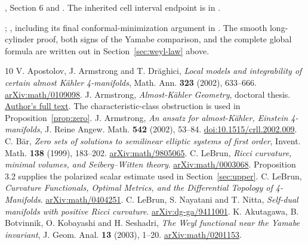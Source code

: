 \documentclass[11pt]{article}
\theoremstyle{definition}
\theoremstyle{remark}
\begin{document}
\begin{description}[style=nextline]
\item[A02.69]
,
Section 6 and
.
The inherited cell interval endpoint is in
.
\item[A02.71--72]
;
,
including its final conformal-minimization argument in
.
The smooth long-cylinder proof, both signs of the Yamabe comparison,
and the complete global formula are written out in
Section~\ref{sec:weyl-law} above.
\end{description}
\endgroup

\begin{thebibliography}{10}
V. Apostolov, J. Armstrong and T. Dr\u aghici,
\emph{Local models and integrability of certain almost K\"ahler 4-manifolds},
Math. Ann. \textbf{323} (2002), 633--666.
\href{https://arxiv.org/abs/math/0109098}{arXiv:math/0109098}.
J. Armstrong, \emph{Almost-K\"ahler Geometry}, doctoral thesis.
\href{https://johnarmstrongmaths.com/publications/resources/thesis.pdf}{Author's full text}.
The characteristic-class obstruction is used in Proposition~\ref{prop:zero}.
J. Armstrong, \emph{An ansatz for almost-K\"ahler, Einstein 4-manifolds},
J. Reine Angew. Math. \textbf{542} (2002), 53--84.
\href{https://doi.org/10.1515/crll.2002.009}{doi:10.1515/crll.2002.009}.
C. B\"ar, \emph{Zero sets of solutions to semilinear elliptic systems
of first order}, Invent. Math. \textbf{138} (1999), 183--202.
\href{https://arxiv.org/abs/math/9805065}{arXiv:math/9805065}.
C. LeBrun, \emph{Ricci curvature, minimal volumes, and Seiberg--Witten theory}.
\href{https://arxiv.org/abs/math/0003068}{arXiv:math/0003068}.
Proposition 3.2 supplies the polarized scalar estimate used in
Section~\ref{sec:upper}.
C. LeBrun, \emph{Curvature Functionals, Optimal Metrics, and the
Differential Topology of 4-Manifolds}.
\href{https://arxiv.org/abs/math/0404251}{arXiv:math/0404251}.
C. LeBrun, S. Nayatani and T. Nitta,
\emph{Self-dual manifolds with positive Ricci curvature}.
\href{https://arxiv.org/abs/dg-ga/9411001}{arXiv:dg-ga/9411001}.
K. Akutagawa, B. Botvinnik, O. Kobayashi and H. Seshadri,
\emph{The Weyl functional near the Yamabe invariant},
J. Geom. Anal. \textbf{13} (2003), 1--20.
\href{https://arxiv.org/abs/math/0201153}{arXiv:math/0201153}.
\end{thebibliography}
\end{document}
